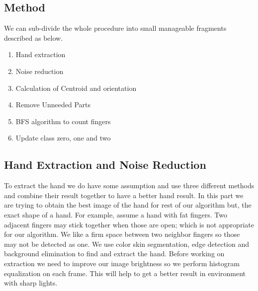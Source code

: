 \subsection{Method}
We can sub-divide the whole procedure into small manageable fragments described as below.
\begin{enumerate}

\item{Hand extraction}
\item{Noise reduction}
\item{Calculation of Centroid and orientation}
\item{Remove Unneeded Parts}
\item{BFS algorithm to count fingers}
\item{Update class zero, one and two}
\end{enumerate}
\subsection{Hand Extraction and Noise Reduction}
To extract the hand we do have some assumption and use three different methods and combine their result together to have a better hand result. In this part we are trying to obtain the best image of the hand for rest of our algorithm but, the exact shape of a hand. For example, assume a hand with fat fingers. Two adjacent fingers may stick together when those are open; which is not appropriate for our algorithm. We like a firm space between two neighbor fingers so those may not be detected as one. We use color skin segmentation, edge detection and background elimination to find and extract the hand. Before working on extraction we need to improve our image brightness so we perform histogram equalization on each frame. This will help to get a better result in environment with sharp lights. 
